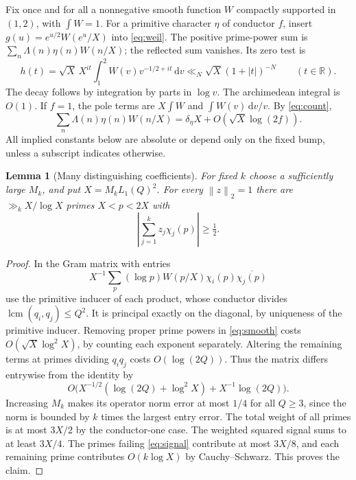 \documentclass[11pt]{article}
\newtheorem{lemma}[theorem]{Lemma}
\newcommand{\R}{\mathbb R}\newcommand{\C}{\mathbb C}
\newcommand{\dd}{\,\mathrm d}
\newcommand{\norm}[1]{\left\lVert #1\right\rVert}
\newcommand{\abs}[1]{\left\lvert #1\right\rvert}
\begin{document}
Fix once and for all a nonnegative smooth function $W$ compactly supported in $(1,2)$, with $\int W=1$. For a primitive character $\eta$ of conductor $f$, insert $g(u)=e^{u/2}W(e^u/X)$ into \eqref{eq:weil}. The positive prime-power sum is $\sum_n\Lambda(n)\eta(n)W(n/X)$; the reflected sum vanishes. Its zero test is
\[
 h(t)=\sqrt X\, X^{it}\int_1^2 W(v)v^{-1/2+it}\dd v
      \ll_N \sqrt X(1+|t|)^{-N} \qquad (t\in\R).
\]
The decay follows by integration by parts in $\log v$. The archimedean integral is $O(1)$. If $f=1$, the pole terms are $X\int W$ and $\int W(v)\dd v/v$. By \eqref{eq:count},
\begin{equation}\label{eq:smooth}
 \sum_n\Lambda(n)\eta(n)W(n/X)=\delta_\eta X+O(\sqrt X\log(2f)).
\end{equation}
All implied constants below are absolute or depend only on the fixed bump, unless a subscript indicates otherwise.

\begin{lemma}[Many distinguishing coefficients]\label{lem:gram}
For fixed $k$ choose a sufficiently large $M_k$, and put $X=M_k L_1(Q)^2$. For every $\norm z_2=1$ there are $\gg_k X/\log X$ primes $X<p<2X$ with
\begin{equation}\label{eq:signal}
 \abs{\sum_{j=1}^k z_j\chi_j(p)}\ge\tfrac12 .
\end{equation}
\end{lemma}
\begin{proof}
In the Gram matrix with entries
\[
 X^{-1}\sum_p(\log p)W(p/X)\chi_i(p)\overline{\chi_j(p)}
\]
use the primitive inducer of each product, whose conductor divides $\operatorname{lcm}(q_i,q_j)\le Q^2$. It is principal exactly on the diagonal, by uniqueness of the primitive inducer. Removing proper prime powers in \eqref{eq:smooth} costs $O(\sqrt X\log^2 X)$, by counting each exponent separately. Altering the remaining terms at primes dividing $q_iq_j$ costs $O(\log(2Q))$. Thus the matrix differs entrywise from the identity by
\[
 O\big(X^{-1/2}(\log(2Q)+\log^2 X)+X^{-1}\log(2Q)\big).
\]
Increasing $M_k$ makes its operator norm error at most $1/4$ for all $Q\ge3$, since the norm is bounded by $k$ times the largest entry error. The total weight of all primes is at most $3X/2$ by the conductor-one case. The weighted squared signal sums to at least $3X/4$. The primes failing \eqref{eq:signal} contribute at most $3X/8$, and each remaining prime contributes $O(k\log X)$ by Cauchy--Schwarz. This proves the claim.
\end{proof}
\end{document}
